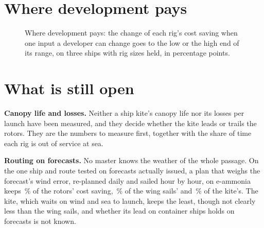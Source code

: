 \documentclass[10pt,a4paper]{article}
\begin{document}
\section{Where development pays}


\begin{figure}[!htb]
\centering
{}
\caption{ Where development pays: the change of each rig's cost saving when one input a developer can change goes to the low or the high end of its range, on three ships with rig sizes held, in percentage points.}
\label{ea:sensitivity}
\end{figure}

\FloatBarrier
\section{What is still open}
\label{sec:ea_open}

\textbf{Canopy life and losses.} Neither a ship kite's canopy life nor its losses per launch have been measured, and they decide whether the kite leads or trails the rotors. They are the numbers to measure first, together with the share of time each rig is out of service at sea.

\textbf{Routing on forecasts.} No master knows the weather of the whole passage. On the one ship and route tested on forecasts actually issued, a plan that weighs the forecast's wind error, re-planned daily and sailed hour by hour, on e-ammonia keeps \NumForecastKeptRotors\,\% of the rotors' cost saving, \NumForecastKeptWings\,\% of the wing sails' and \NumForecastKeptKite\,\% of the kite's. The kite, which waits on wind and sea to launch, keeps the least, though not clearly less than the wing sails, and whether its lead on container ships holds on forecasts is not known.
\end{document}
